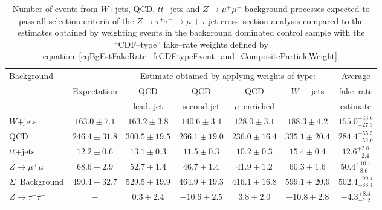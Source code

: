 \begin{table}[t]
\begin{center}
\tablesize
\begin{tabular}{|l|c|c|c|c|c|c|}
\hline
\multirow{2}{22mm}{Background}  &             & \multicolumn{4}{c|}{Estimate obtained by applying weights of type:} & Average \\
\multirow{2}{18mm}{Process}     & Expectation & QCD       & QCD        & QCD             & \multirow{2}{18mm}{$W$ + jets} & fake--rate \\
                                &             & lead. jet & second jet & $\mu$--enriched &                          & estimate \\
\hline
\hline
$W$+jets                        & $163.0 \pm  7.1$ & $163.2 \pm  3.8$ & $140.6 \pm  3.4$ & $128.0 \pm  3.1$ & $188.3 \pm  4.2$ & $155.0^{+33.6}_{-27.3}$ \\
QCD                             & $246.4 \pm 31.8$ & $300.5 \pm 19.5$ & $266.1 \pm 19.0$ & $236.0 \pm 16.4$ & $335.1 \pm 20.4$ & $284.4^{+55.5}_{-52.0}$ \\
$t\bar{t}$+jets                 & $ 12.2 \pm  0.6$ & $ 13.1 \pm  0.3$ & $ 11.5 \pm  0.3$ & $ 10.2 \pm  0.3$ & $ 15.4 \pm  0.4$ & $ 12.6^{+2.8}_{-2.4}$ \\
$Z \rightarrow \mu^{+} \mu^{-}$ & $ 68.6 \pm  2.9$ & $ 52.7 \pm  1.4$ & $ 46.7 \pm  1.4$ & $ 41.9 \pm  1.2$ & $ 60.3 \pm  1.6$ & $ 50.4^{+10.1}_{-8.6}$ \\
\hline
$\Sigma$~Background             & $490.4 \pm 32.7$ & $529.5 \pm 19.9$ & $464.9 \pm 19.3$ & $416.1 \pm 16.8$ & $599.1 \pm 20.9$ & $502.4^{+99.4}_{-88.4}$ \\ 
\hline
\hline
$Z \rightarrow \tau^{+} \tau^{-}$ & $-$ & $0.3 \pm 2.4$ & $-10.6 \pm 2.5$ & $3.8 \pm 2.0$ & $-10.8 \pm 2.8$ & $-4.3^{+8.4}_{-7.2}$ \\
\hline
\end{tabular}
\end{center}
\begin{center}
\caption{\captiontext Number of events from $W$+jets, QCD, $t\bar{t}$+jets
         and $Z \rightarrow \mu^{+} \mu^{-}$ background processes
	 expected to pass all selection criteria of the 
         $Z \rightarrow \tau^{+} \tau^{-} \rightarrow \mu + \tau\mbox{-jet}$ cross--section analysis         
         compared to the estimates obtained by weighting events in the background dominated control sample 
         with the ``CDF--type'' fake--rate weights
         defined by equation~\ref{eqBgEstFakeRate_frCDFtypeEvent_and_CompositeParticleWeight}.}
\label{tabBgEstFakeRate_frCDFtypeResults}
\end{center}
\end{table}

